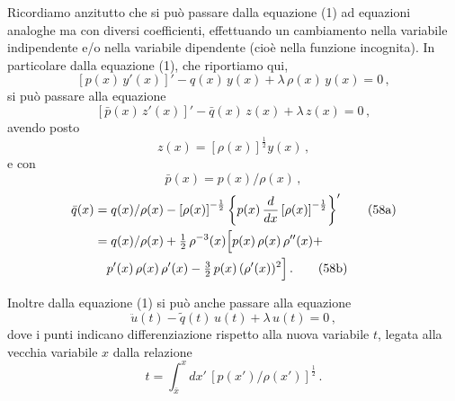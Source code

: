 \documentclass[11pt, a4paper]{book}
\numberwithin{equation}{section}
\begin{document}
Ricordiamo anzitutto che si può passare dalla equazione (1)
ad equazioni analoghe ma con diversi coefficienti, effettuando un cambiamento nella variabile indipendente e/o nella variabile dipendente (cioè
nella funzione incognita). In particolare dalla equazione (1), che riportiamo qui,
\begin{equation}
\left[p(x)\, y'(x)\right]' - q(x)\, y(x) + \lambda\, \rho(x)\, y(x) = 0 \,, \tag{1}
\end{equation}
si può passare alla equazione
\begin{equation}
\left[\bar{p}(x)\, z'(x)\right]' - \bar{q}(x)\, z(x) + \lambda\, z(x) = 0 \,, \tag{55}
\end{equation}
avendo posto
\begin{equation}
z(x) = \left[\rho(x)\right]^{\frac{1}{2}} y(x) \,, \tag{56}
\end{equation}
e con
\begin{equation}
\bar{p}(x) = p(x) / \rho(x) \,, \tag{57}
\end{equation}
\begin{align}
\bar{q}(x) &= q(x)/\rho(x) - \left[\rho(x)\right]^{-\frac{1}{2}} \left\{ p(x)\, \frac{d}{dx}\left[\rho(x)\right]^{-\frac{1}{2}} \right\}' \tag{58a} \\
&= q(x)/\rho(x) + \tfrac{1}{2}\, \rho^{-3}(x) \Big[ p(x)\, \rho(x)\, \rho''(x) + \notag \\
&\quad p'(x)\, \rho(x)\, \rho'(x) - \tfrac{3}{2}\, p(x)\, (\rho'(x))^2 \Big] \,. \tag{58b}
\end{align}

Inoltre dalla equazione (1) si può anche passare alla equazione
\begin{equation}
\ddot{u}(t) - \tilde{q}(t)\, u(t) + \lambda\, u(t) = 0 \,, \tag{59}
\end{equation}
dove i punti indicano differenziazione rispetto alla nuova variabile $t$,
legata alla vecchia variabile $x$ dalla relazione
\begin{equation}
t = \int_{\bar{x}}^{x} dx'\, \left[p(x')/\rho(x')\right]^{\frac{1}{2}} \,. \tag{60}
\end{equation}

\end{document}

